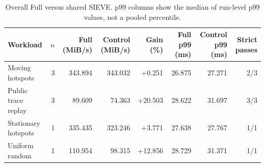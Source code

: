 \begin{table}[t]
\centering
\caption{Overall Full versus shared SIEVE. p99 columns show the median of run-level p99 values, not a pooled percentile.}
\label{tab:tokenfs-independent-4}
\begin{tabular}{lrrrrrrr}
\toprule
Workload & $n$ & Full (MiB/s) & Control (MiB/s) & Gain (\%) & Full p99 (ms) & Control p99 (ms) & Strict passes \\
\midrule
Moving hotspots & 3 & 343.894 & 343.032 & +0.251 & 26.875 & 27.271 & 2/3 \\
Public trace replay & 3 & 89.609 & 74.363 & +20.503 & 28.622 & 31.697 & 3/3 \\
Stationary hotspots & 1 & 335.435 & 323.246 & +3.771 & 27.638 & 27.767 & 1/1 \\
Uniform random & 1 & 110.954 & 98.315 & +12.856 & 28.729 & 31.371 & 1/1 \\
\bottomrule
\end{tabular}
\end{table}
